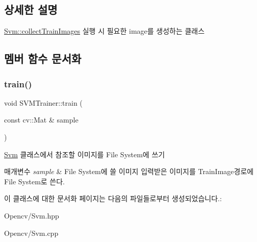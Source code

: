 \subsection{상세한 설명}
\hyperlink{class_svm_a1b18e97fffb268f9cfe91152f7e96298}{Svm\+::collect\+Train\+Images} 실행 시 필요한 image를 생성하는 클래스 

\subsection{멤버 함수 문서화}
\mbox{\label{class_s_v_m_trainer_a60f3eb8020709966c067246c98b610c4}} 
\subsubsection{\texorpdfstring{train()}{train()}}
{\footnotesize\ttfamily void S\+V\+M\+Trainer\+::train (\begin{DoxyParamCaption}\item[{const cv\+::\+Mat \&}]{sample }\end{DoxyParamCaption})}



\hyperlink{class_svm}{Svm} 클래스에서 참조할 이미지를 File System에 쓰기 


\begin{DoxyParams}{매개변수}
{\em sample} & File System에 쓸 이미지 입력받은 이미지를 \textquotesingle{}Train\+Image\textquotesingle{}경로에 File System로 쓴다. \\
\hline
\end{DoxyParams}


이 클래스에 대한 문서화 페이지는 다음의 파일들로부터 생성되었습니다.\+:\begin{DoxyCompactItemize}
\item 
Opencv/Svm.\+hpp\item 
Opencv/Svm.\+cpp\end{DoxyCompactItemize}
